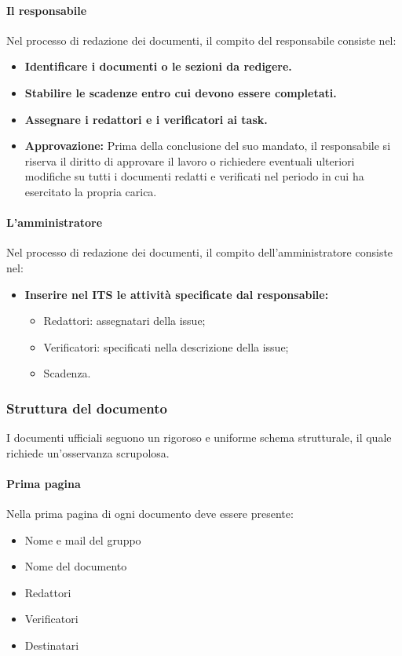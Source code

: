 \documentclass{article}
\begin{document}
\begin{enumerate}
\paragraph{Il responsabile}
Nel processo di redazione dei documenti, il compito del responsabile consiste nel:
\begin{itemize}
    \item \textbf{Identificare i documenti o le sezioni da redigere. }
    \item \textbf{Stabilire le scadenze entro cui devono essere completati.}
    \item \textbf{Assegnare i redattori e i verificatori ai task.}
    \item \textbf{Approvazione:} Prima della conclusione del suo mandato, il responsabile si riserva il diritto di approvare il lavoro o richiedere eventuali ulteriori modifiche su tutti i documenti redatti e verificati nel periodo in cui ha esercitato la propria carica.
\end{itemize}

\paragraph{L'amministratore}
Nel processo di redazione dei documenti, il compito dell'amministratore consiste nel:
\begin{itemize}
    \item \textbf{Inserire nel ITS le attività specificate dal responsabile:} \begin{itemize}
              \item Redattori: assegnatari della issue;
              \item Verificatori: specificati nella descrizione della issue;
              \item Scadenza.
          \end{itemize}
\end{itemize}
\subsubsection{Struttura del documento}
I documenti ufficiali seguono un rigoroso e uniforme schema strutturale, il quale richiede un'osservanza scrupolosa.
\paragraph*{Prima pagina}
Nella prima pagina di ogni documento deve essere presente:
\begin{itemize}
    \item Nome e mail del gruppo
    \item Nome del documento
    \item Redattori
    \item Verificatori
    \item Destinatari
\end{itemize}

\end{enumerate}
\end{document}
